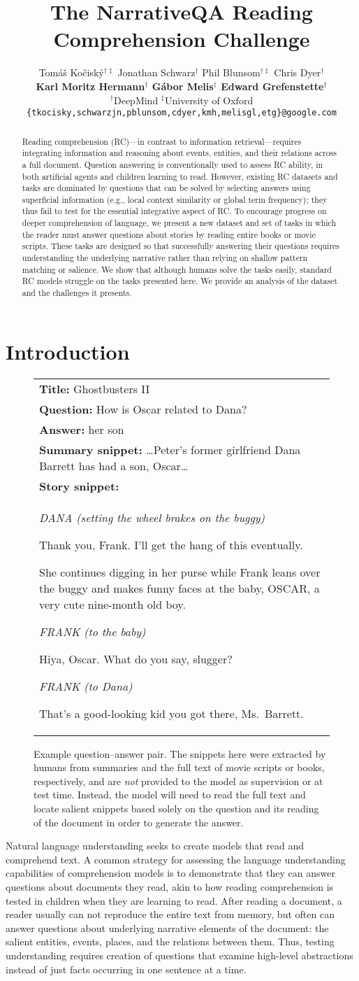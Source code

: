 \documentclass[11pt,letterpaper]{article}
\title{The NarrativeQA Reading Comprehension Challenge}
\author{
Tom\'a\v s Ko\v cisk\'y$^{\dag\ddag}$ \quad
Jonathan Schwarz$^{\dag}$ \quad 
Phil Blunsom$^{\dag\ddag}$ \quad 
Chris Dyer$^{\dag}$ \\
{\bf Karl Moritz Hermann$^{\dag}$ \quad 
G\'abor Melis$^{\dag}$ \quad 
Edward Grefenstette$^{\dag}$} \\
$^{\dag}$DeepMind \quad
$^{\ddag}$University of Oxford \\
{\tt \{tkocisky,schwarzjn,pblunsom,cdyer,kmh,melisgl,etg\}@google.com}
}
\date{}
\newcommand{\examplea}[7]{\begin{figure}[tb]
\begin{tabular}{p{0.92\columnwidth}}
\toprule
\noindent \textbf{Title:} #1\\
\textbf{Question:} #2\\
\textbf{Answer:} #3\\
\textbf{Summary snippet:} #4\\
\textbf{Story snippet:} #5 \\
\bottomrule
\end{tabular}
\caption{#6}
\label{#7}
\end{figure}}
\newcommand{\ghostexample}{\examplea{Ghostbusters II}
{\small How is Oscar related to Dana?}
{\small her son}
{\small\dots Peter's former girlfriend Dana Barrett has had a son, Oscar\dots}
{\\
\small \centerline{\textit{DANA (setting the wheel brakes on the buggy)}}
\small \centerline{Thank you, Frank.  I'll get the hang of this eventually.}

\vspace{0.2cm}
\small She continues digging in her purse while Frank leans over the buggy and makes funny faces at the baby, OSCAR, a very cute nine-month old boy.

\vspace{0.2cm}
\small\centerline{\textit{FRANK (to the baby)}}
\small\centerline{Hiya, Oscar.  What do you say, slugger?}

\vspace{0.2cm}
\small\centerline{\textit{FRANK (to Dana)}}
\small That's a good-looking kid you got there, Ms.\ Barrett.}
{Example question--answer pair. The snippets here were extracted by humans from summaries and the full text of movie scripts or books, respectively, and are \emph{not} provided to the model as supervision or at test time. Instead, the model will need to read the full text and locate salient snippets based solely on the question and its reading of the document in order to generate the answer.}
{fig:example1}}
\begin{document}
\maketitle
\begin{abstract}
Reading comprehension (RC)---in contrast to information retrieval---requires integrating information and reasoning about events, entities, and their relations across a full document. Question answering is conventionally used to assess RC ability, in both artificial agents and children learning to read. However,
existing RC datasets and tasks are dominated by questions that can be solved by selecting answers using superficial information (e.g., local context similarity or global term frequency); they thus fail to test for the essential integrative aspect of RC. To encourage progress on deeper comprehension of language, we present a new dataset and set of tasks in which the reader must answer questions about stories by reading entire books or movie scripts. These tasks are designed so that successfully answering their questions requires understanding the underlying narrative rather than relying on shallow pattern matching or salience. We show that although humans solve the tasks easily, standard RC models struggle on the tasks presented here. We provide an analysis of the dataset and the challenges it presents.
\end{abstract}

\section{Introduction}

\ghostexample

Natural language understanding seeks to create models that read and comprehend text. A common strategy for assessing the language understanding capabilities of comprehension models is to demonstrate that they can answer questions about documents they read, akin to how reading comprehension is tested in children when they are learning to read.
After reading a document, a reader usually can not reproduce the entire text from memory, but often can answer questions about underlying narrative elements of the document: the salient entities, events, places, and the relations between them.
Thus, testing understanding requires creation of questions that examine high-level abstractions instead of just facts occurring in one sentence at a time.
\end{document}
